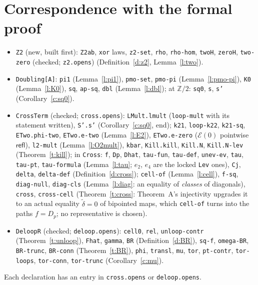\documentclass[11pt]{amsart}
\theoremstyle{definition}
\theoremstyle{remark}
\newcommand{\Z}{\mathbb{Z}}
\newcommand{\code}[1]{\texttt{#1}}
\newcommand{\refl}{\mathsf{refl}}
\newcommand{\cE}{\mathcal E}
\begin{document}
\section{Correspondence with the formal proof}\label{s:corr}
\begin{itemize}
\item \code{Z2} (new, built first): \code{Z2ab}, \code{xor} laws,
  \code{z2-set}, \code{rho}, \code{rho-hom}, \code{twoH}, \code{zeroH},
  \code{two-zero} (checked; \code{z2.opens}) (Definition~\ref{d:z2}, Lemma~\ref{l:two}).
\item \code{Doubling[A]}: \code{pi1} (Lemma~\ref{l:pi1}), \code{pmo-set}, \code{pmo-pi} (Lemma~\ref{l:pmo-pi}),
  \code{K0} (Lemma~\ref{l:K0}), \code{sq}, \code{ap-sq}, \code{dbl}
  (Lemma~\ref{l:dbl}); at $\Z/2$: \code{sq0}, \code{s}, \code{s'}
  (Corollary~\ref{c:sq0}).
\item \code{CrossTerm} (checked; \code{cross.opens}): \code{LMult.lmult}
  (\code{loop-mult} with its statement written), \code{S'.s'}
  (Corollary~\ref{c:sq0}, end); \code{k21}, \code{loop-k22}, \code{k21-sq},
  \code{ETwo.phi-two}, \code{ETwo.e-two} (Lemma~\ref{l:E2}), \code{ETwo.e-zero}
  ($\cE(0)$ pointwise $\refl$), \code{l2-mult} (Lemma~\ref{l:O2mult}),
  \code{kbar}, \code{Kill.kill}, \code{Kill.N}, \code{Kill.N-lev}
  (Theorem~\ref{t:kill}); in \code{Cross}: \code{f}, \code{Dp}, \code{Dhat},
  \code{tau-fun}, \code{tau-def}, \code{unev-ev}, \code{tau}, \code{tau-pt},
  \code{tau-formula} (Lemma~\ref{l:tau}; $e_2$, $e_4$ are the locked
  \code{Lev} ones), \code{Cj}, \code{delta}, \code{delta-def}
  (Definition~\ref{d:cross}); \code{cell-of} (Lemma~\ref{l:cell}),
  \code{f-sq}, \code{diag-null}, \code{diag-cls} (Lemma~\ref{l:diag}: an equality of
  \emph{classes} of diagonals), \code{cross}, \code{cross-cell} (Theorem~\ref{t:cross}: Theorem~A's
  injectivity upgrades it to an actual equality $\tilde\delta=0$ of bipointed
  maps, which \code{cell-of} turns into the paths $f=D_p$; no representative
  is chosen).
\item \code{DeloopR} (checked; \code{deloop.opens}): \code{cell0}, \code{rel},
  \code{unloop-contr} (Theorem~\ref{t:unloop}),
  \code{Fhat}, \code{gamma}, \code{BR} (Definition~\ref{d:BR}), \code{sq-f}, \code{omega-BR},
  \code{BR-trunc}, \code{BR-conn} (Theorem~\ref{t:BR}), \code{phi}, \code{transl}, \code{mu},
  \code{tor}, \code{pt-contr}, \code{tor-loops}, \code{tor-conn}, \code{tor-trunc} (Corollary~\ref{c:mu}).
\end{itemize}
Each declaration has an entry in \code{cross.opens} or \code{deloop.opens}.
\end{document}
